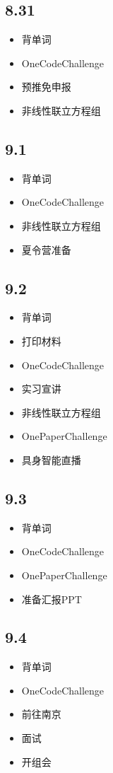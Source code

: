 \documentclass[UTF8]{ctexart}
\begin{document}
\subsection*{8.31}
\begin{itemize}
    \item 背单词
    \item OneCodeChallenge
    \item 预推免申报
    \item 非线性联立方程组
\end{itemize}

\subsection*{9.1}
\begin{itemize}
    \item 背单词
    \item OneCodeChallenge
    \item 非线性联立方程组
    \item 夏令营准备
\end{itemize}

\subsection*{9.2}
\begin{itemize}
    \item 背单词
    \item 打印材料
    \item OneCodeChallenge
    \item 实习宣讲
    \item 非线性联立方程组
    \item OnePaperChallenge
    \item 具身智能直播
\end{itemize}

\subsection*{9.3}
\begin{itemize}
    \item 背单词
    \item OneCodeChallenge
    \item OnePaperChallenge
    \item 准备汇报PPT
\end{itemize}

\subsection*{9.4}
\begin{itemize}
    \item 背单词
    \item OneCodeChallenge
    \item 前往南京
    \item 面试
    \item 开组会
\end{itemize}
\end{document}
